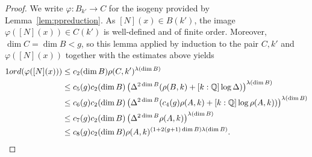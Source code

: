 \documentclass[12pt,oneside]{amsart}
\numberwithin{maincounter}{section}
\numberwithin{equation}{section}
\def\QQ{\mathbb{Q}}
\newcommand{\IQ}{{\QQ}}
\newcommand{\cL}{{\mathcal L}}
\newcommand{\ord}[1]{{\rm ord}({#1})}
\begin{document}
\begin{proof}


  We write $\varphi\colon B_{k'}\rightarrow C$ for the isogeny provided by
  Lemma~\ref{lem:ppreduction}. 
  As $[N](x)\in B(k')$, the image $\varphi([N](x))\in C(k')$
  is well-defined and of finite order. 
  Moreover, $\dim C=\dim B < g$, so this lemma applied by
  induction to the pair $C,k'$ and  $\varphi([N](x))$
  together with the
  estimates above
  yields
  \begin{alignat*}1
    \ord{\varphi([N](x))} &\le  c_2(\dim B)
    \rho(C,k')^{\lambda(\dim B)} \\
    &\le c_5(g) c_2(\dim B) \left(\Delta^{2\dim B}(\rho(B,k)+[k:\IQ]
      \log\Delta)\right)^{\lambda(\dim B)}
    \\
    &\le c_6(g) c_2(\dim B)
    \left(\Delta^{2\dim B}(c_4(g)\rho(A,k)+[k:\IQ] \log\rho(A,k))\right)^{\lambda(\dim B)}
    \\
    &\le c_7(g) c_2(\dim B) \left(\Delta^{2\dim B}\rho(A,k)\right)^{\lambda(\dim B)}\\
    &\le c_8(g) c_2(\dim B) \rho(A,k)^{(1+2(g+1)\dim B)\lambda(\dim B)}. 
  \end{alignat*}
  

\end{proof}
\end{document}
